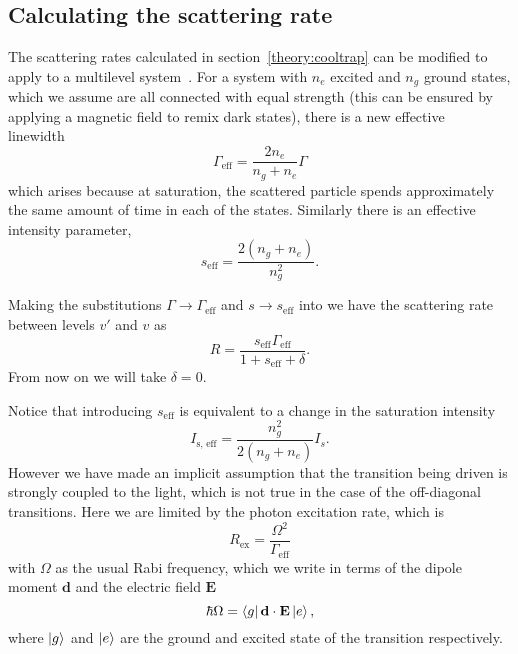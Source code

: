 \subsection{Calculating the scattering rate}

The scattering rates calculated in section~\ref{theory:cooltrap} can be modified to
apply to a multilevel system~\cite{Metcalf1999}. For a system with $n_e$
excited and $n_g$ ground states, which we assume are all connected with equal
strength (this can be ensured by applying a magnetic field to remix dark
states), there is a new effective linewidth~\cite{Williams2017}
%
\begin{equation}
  \Gamma_\text{eff} = \frac{2n_e}{n_g + n_e}\Gamma
\end{equation}
%
which arises because at saturation, the scattered particle spends approximately
the same amount of time in each of the states. Similarly there is an effective
intensity parameter,
%
\begin{equation}
  s_\text{eff} = \frac{2(n_g + n_e)}{n_g^2}.
\end{equation}
%

Making the substitutions $\Gamma\rightarrow\Gamma_\text{eff}$ and $s\rightarrow
s_\text{eff}$ into  we have the scattering
rate between levels $v'$ and $v$ as
%
\begin{equation}
  R = \frac{s_\text{eff}\Gamma_\text{eff}}{1 + s_\text{eff} + \delta}.
\end{equation}
%
From now on we will take $\delta = 0$.

Notice that introducing $s_\text{eff}$ is equivalent to a change in the
saturation intensity
%
\begin{equation}
  I_\text{s, eff} = \frac{n_g^2}{2(n_g + n_e)}I_s.
\end{equation}
%
However we have made an implicit assumption that the transition being driven is
strongly coupled to the light, which is not true in the case of the
off-diagonal transitions. Here we are limited by the photon excitation rate,
which is
%
\begin{equation}
  R_\text{ex} = \frac{\Omega^2}{\Gamma_\text{eff}}
\end{equation}
%
with $\Omega$ as the usual Rabi frequency, which we write in terms of the
dipole moment $\mathbf{d}$ and the electric field $\mathbf{E}$
%
\begin{equation}
  \hbar \Omega = \bra{g}\mathbf{d}\cdot\mathbf{E}\ket{e},
\end{equation}
%
where $\ket{g}$ and $\ket{e}$ are the ground and excited state of the
transition respectively.

